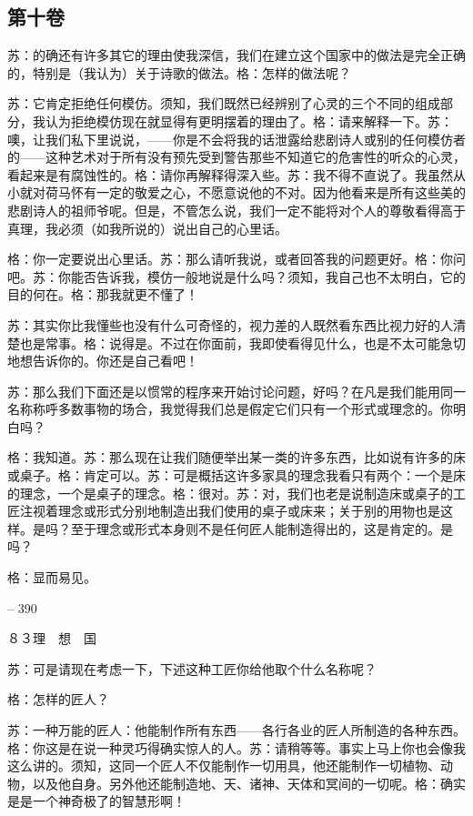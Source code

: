 \documentclass[11pt,oneside]{book}
\begin{document}
\begin{common-format}
    

\chapter{第十卷}
苏：的确还有许多其它的理由使我深信，我们在建立这个国家中的做法是完全正确的，特别是（我认为）关于诗歌的做法。格：怎样的做法呢？

    苏：它肯定拒绝任何模仿。须知，我们既然已经辨别了心灵的三个不同的组成部分，我认为拒绝模仿现在就显得有更明摆着的理由了。格：请来解释一下。苏：噢，让我们私下里说说，——你是不会将我的话泄露给悲剧诗人或别的任何模仿者的——这种艺术对于所有没有预先受到警告那些不知道它的危害性的听众的心灵，看起来是有腐蚀性的。格：请你再解释得深入些。苏：我不得不直说了。我虽然从小就对荷马怀有一定的敬爱之心，不愿意说他的不对。因为他看来是所有这些美的悲剧诗人的祖师爷呢。但是，不管怎么说，我们一定不能将对个人的尊敬看得高于真理，我必须（如我所说的）说出自己的心里话。

    


    格：你一定要说出心里话。苏：那么请听我说，或者回答我的问题更好。格：你问吧。苏：你能否告诉我，模仿一般地说是什么吗？须知，我自己也不太明白，它的目的何在。格：那我就更不懂了！

    苏：其实你比我懂些也没有什么可奇怪的，视力差的人既然看东西比视力好的人清楚也是常事。格：说得是。不过在你面前，我即使看得见什么，也是不太可能急切地想告诉你的。你还是自己看吧！

    苏：那么我们下面还是以惯常的程序来开始讨论问题，好吗？在凡是我们能用同一名称称呼多数事物的场合，我觉得我们总是假定它们只有一个形式或理念的。你明白吗？

    格：我知道。苏：那么现在让我们随便举出某一类的许多东西，比如说有许多的床或桌子。格：肯定可以。苏：可是概括这许多家具的理念我看只有两个：一个是床的理念，一个是桌子的理念。格：很对。苏：对，我们也老是说制造床或桌子的工匠注视着理念或形式分别地制造出我们使用的桌子或床来；关于别的用物也是这样。是吗？至于理念或形式本身则不是任何匠人能制造得出的，这是肯定的。是吗？

    格：显而易见。

    

-- 390

    ８３理　想　国

    苏：可是请现在考虑一下，下述这种工匠你给他取个什么名称呢？

    格：怎样的匠人？

    苏：一种万能的匠人：他能制作所有东西——各行各业的匠人所制造的各种东西。格：你这是在说一种灵巧得确实惊人的人。苏：请稍等等。事实上马上你也会像我这么讲的。须知，这同一个匠人不仅能制作一切用具，他还能制作一切植物、动物，以及他自身。另外他还能制造地、天、诸神、天体和冥间的一切呢。格：确实是是一个神奇极了的智慧形啊！


\end{common-format}
\end{document}
